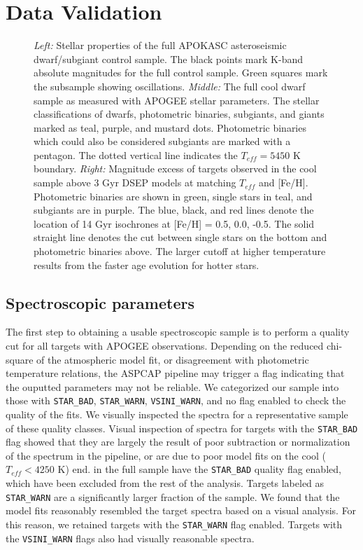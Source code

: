 \documentclass[manuscript]{aastex6}
\newcommand{\Teff}{\ensuremath{T_{eff}}}
\newcommand{\STARBAD}{\texttt{STAR\_BAD}}
\newcommand{\STARWARN}{\texttt{STAR\_WARN}}
\newcommand{\VSINIWARN}{\texttt{VSINI\_WARN}}
\newcommand{\gvs}{\authorcomment1}
\begin{document}
\section{Data Validation}
\label{sec:analysis}

\begin{figure*}
    \caption{\emph{Left:} Stellar properties of the full APOKASC 
    asteroseismic dwarf/subgiant control sample. The black points mark
    K-band absolute magnitudes for the full control sample. Green squares mark
    the subsample showing oscillations. 
    \emph{Middle:} The full cool dwarf sample as measured with APOGEE stellar 
    parameters. The stellar classifications of dwarfs, photometric binaries, 
    subgiants, and giants marked as teal, purple, and mustard
    dots. Photometric binaries which could also be considered subgiants are
    marked with a pentagon.  The dotted vertical line indicates the 
    \(\Teff = 5450\) K boundary.
    \emph{Right:} Magnitude excess of targets observed in the cool 
    sample above 3 Gyr DSEP models at matching \Teff{} and 
    [Fe/H]. Photometric binaries are shown in green, single stars in teal, and
    subgiants are in purple. The blue, black, and red lines denote the location of 14 Gyr
    isochrones at [Fe/H] = 0.5, 0.0, -0.5. The solid straight line denotes the 
    cut between single stars on the bottom and photometric binaries
above. The larger cutoff at higher temperature results from the faster age
evolution for hotter stars.\label{fig:sample}}
\end{figure*}

\subsection{Spectroscopic parameters}

The first step to obtaining a usable spectroscopic sample is to perform a 
quality cut for all targets with APOGEE observations.
Depending on the reduced chi-square of the atmospheric model fit, or
disagreement with photometric temperature relations, the ASPCAP pipeline
may trigger a flag indicating that the ouputted parameters may not be
reliable. We categorized our sample into those with \STARBAD, \STARWARN,
\VSINIWARN{}, and no flag enabled to check the quality of the fits. We
visually inspected the spectra for a representative sample of these
quality classes. 
Visual inspection of spectra for targets with the \STARBAD{} flag showed that they are 
largely the result of poor subtraction or normalization of the spectrum in the
pipeline, or are due to poor model fits on the cool (\(\Teff < 4250\) K) end. 
\gvs{Calculate percentage} in the full sample have the \STARBAD{} quality 
flag enabled, which have been excluded from the rest of the analysis. 
Targets labeled as \STARWARN{} are a significantly larger fraction of the 
sample. We found that the model fits reasonably resembled the target spectra
based on a visual analysis. 
For this reason, we retained targets with the \STARWARN{} flag enabled. 
Targets with the \VSINIWARN{} flags also had visually reasonable spectra.
\end{document}
